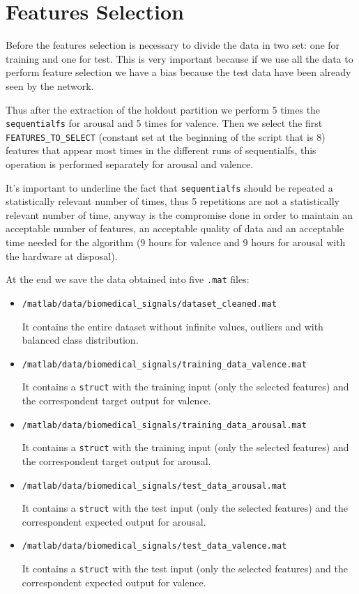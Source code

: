 \documentclass[a4paper]{report}
\begin{document}
	\section{Features Selection}
	\noindent Before the features selection is necessary to divide the data in two set: one for training and one for test. This is very important because if we use all the data to perform feature selection we have a bias because the test data have been already seen by the network.
	
	\noindent Thus after the extraction of the holdout partition we perform 5 times the \texttt{sequentialfs} for arousal and 5 times for valence. Then we select the first \texttt{FEATURES\_TO\_SELECT} (constant set at the beginning of the script that is 8) features that appear most times in the different runs of sequentialfs, this operation is performed separately for arousal and valence.
	
	\noindent It's important to underline the fact that \texttt{sequentialfs} should be repeated a statistically relevant number of times, thus 5 repetitions are not a statistically relevant number of time, anyway is the compromise done in order to maintain an acceptable number of features, an acceptable quality of data and an acceptable time needed for the algorithm (9 hours for valence and 9 hours for arousal with the hardware at disposal).
	
	\noindent At the end we save the data obtained into five \texttt{.mat} files:
	\begin{itemize}
		\item \texttt{/matlab/data/biomedical\_signals/dataset\_cleaned.mat}
		
		\noindent It contains the entire dataset without infinite values, outliers and with balanced class distribution.
		
		\item \texttt{/matlab/data/biomedical\_signals/training\_data\_valence.mat}
		
		\noindent It contains a \texttt{struct} with the training input (only the selected features) and the correspondent target output for valence.
		
		\item \texttt{/matlab/data/biomedical\_signals/training\_data\_arousal.mat}
		
		\noindent It contains a \texttt{struct} with the training input (only the selected features) and the correspondent target output for arousal.
		
		\item \texttt{/matlab/data/biomedical\_signals/test\_data\_arousal.mat}
		
		\noindent It contains a \texttt{struct} with the test input (only the selected features) and the correspondent expected output for arousal.
		
		\item \texttt{/matlab/data/biomedical\_signals/test\_data\_valence.mat}
		
		\noindent It contains a \texttt{struct} with the test input (only the selected features) and the correspondent expected output for valence.
	\end{itemize}
\end{document}
